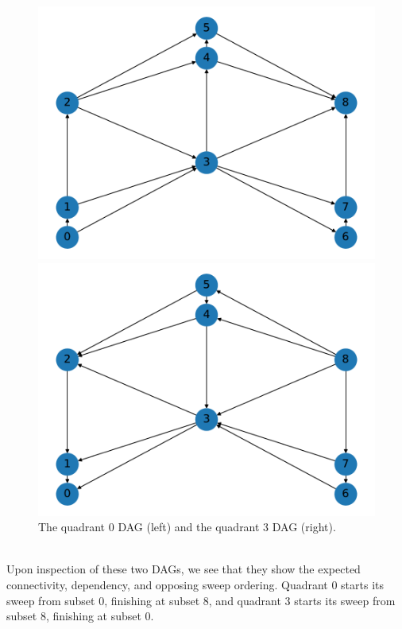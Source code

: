 \begin{figure}[H]
\begin{minipage}[c]{0.5\textwidth}
\includegraphics[scale=0.5]{../../figures/9_graph0.pdf}
\end{minipage}
\begin{minipage}[c]{0.5\textwidth}
\includegraphics[scale=0.5]{../../figures/9_graph3.pdf}
\end{minipage}
\caption{The quadrant 0 DAG (left) and the quadrant 3 DAG (right).}
\label{25_q0q3graphs}
\end{figure}
\\
Upon inspection of these two DAGs, we see that they show the expected connectivity, dependency, and opposing sweep ordering.
Quadrant 0 starts its sweep from subset 0, finishing at subset 8, and quadrant 3 starts its sweep from subset 8, finishing at subset 0.

